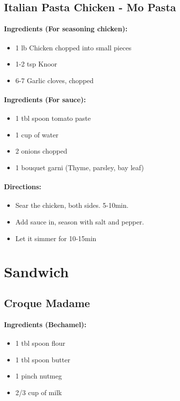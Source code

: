 \documentclass{article}
\begin{document}
\subsection{Italian Pasta Chicken - Mo Pasta}

\paragraph{Ingredients (For seasoning chicken):}
\begin{itemize}
	\item 1 lb Chicken chopped into small pieces
	\item 1-2 tsp Knoor
	\item 6-7 Garlic cloves, chopped
\end{itemize}

\paragraph{Ingredients (For sauce):}
\begin{itemize}
	\item 1 tbl spoon tomato paste
	\item 1 cup of water
	\item 2 onions chopped
	\item 1 bouquet garni (Thyme, parsley, bay leaf)
\end{itemize}

\paragraph{Directions:}
\begin{itemize}
	\item Sear the chicken, both sides. 5-10min.
	\item Add sauce in, season with salt and pepper.
	\item Let it simmer for 10-15min
\end{itemize}

\section{Sandwich}

\subsection{Croque Madame}

\paragraph{Ingredients (Bechamel):}
\begin{itemize}
	\item 1 tbl spoon flour
	\item 1 tbl spoon butter
	\item 1 pinch nutmeg
	\item 2/3 cup of milk
\end{itemize}
\end{document}

